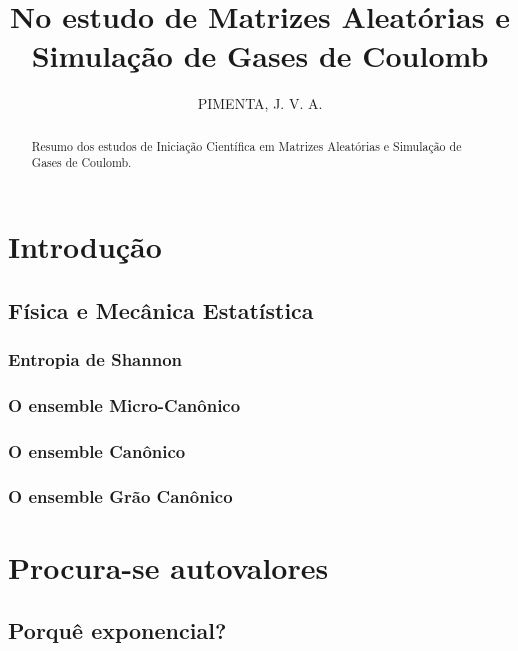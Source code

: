 \documentclass[11pt,oneside,a4paper]{report}
\title{
	{No estudo de Matrizes Aleatórias e Simulação de Gases de Coulomb}\\
}
\author{PIMENTA, J. V. A.}
\begin{document}
\maketitle

\begin{abstract}
	Resumo dos estudos de Iniciação Científica em Matrizes Aleatórias e Simulação de Gases de Coulomb.
\end{abstract}

\tableofcontents

\chapter{Introdução}


\section{Física e Mecânica Estatística}


\subsection{Entropia de Shannon}


\subsection{O ensemble Micro-Canônico}


\subsection{O ensemble Canônico}


\subsection{O ensemble Grão Canônico}


\chapter{Procura-se autovalores}


\section{Porquê exponencial?}

\end{document}
